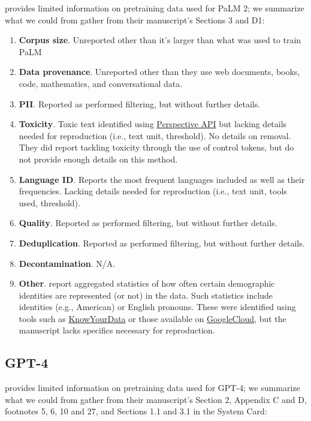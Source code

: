 \documentclass{article}
\begin{document}
\citet{Anil2023PaLM2T} provides limited information on pretraining data used for PaLM 2; we summarize what we could from gather from their manuscript's Sections 3 and D1:

\begin{enumerate}
    \item \textbf{Corpus size}. Unreported other than it's larger than what was used to train PaLM~\citep{Chowdhery2022PaLMSL}
    \item \textbf{Data provenance}. Unreported other than they use web documents, books, code, mathematics, and conversational data. 
    \item \textbf{PII}. Reported as performed filtering, but without further details.
    \item \textbf{Toxicity}. Toxic text identified using \href{https://perspectiveapi.com/}{Perspective API} but lacking details needed for reproduction (i.e., text unit, threshold). No details on removal. They did report tackling toxicity through the use of control tokens, but do not provide enough details on this method.
    \item \textbf{Language ID}. Reports the most frequent languages included as well as their frequencies. Lacking details needed for reproduction (i.e., text unit, tools used, threshold).
    \item \textbf{Quality}.  Reported as performed filtering, but without further details.
    \item \textbf{Deduplication}. Reported as performed filtering, but without further details.
    \item \textbf{Decontamination}. N/A.
    \item \textbf{Other}. \citet{Anil2023PaLM2T} report aggregated statistics of how often certain demographic identities are represented (or not) in the data. Such statistics include identities (e.g., American) or English pronouns. These were identified using tools such as \href{https://knowyourdata.withgoogle.com/}{KnowYourData} or those available on \href{https://cloud.google.com/natural-language/docs/classifying-text}{GoogleCloud}, but the manuscript lacks specifics necessary for reproduction.
\end{enumerate}

\subsection{GPT-4~\citep{OpenAI2023GPT4TR}}\label{appendix:llm:gpt4} 

\citet{OpenAI2023GPT4TR} provides limited information on pretraining data used for GPT-4; we summarize what we could from gather from their manuscript's Section 2, Appendix C and D, footnotes 5, 6, 10 and 27, and Sections 1.1 and 3.1 in the System Card:
\end{document}
